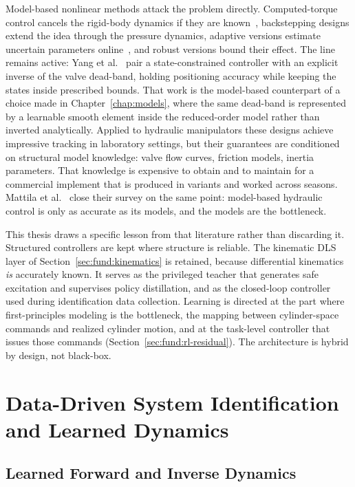 Model-based nonlinear methods attack the problem directly.
Computed-torque control cancels the rigid-body dynamics if they are
known~\cite{slotine1991applied}, backstepping designs extend the idea
through the pressure dynamics, adaptive versions estimate uncertain
parameters online~\cite{astrom1995adaptive}, and robust versions bound
their effect. The line remains active: Yang et
al.~\cite{yang2026stateconstrained} pair a state-constrained controller
with an explicit inverse of the valve dead-band, holding positioning
accuracy while keeping the states inside prescribed bounds. That work is
the model-based counterpart of a choice made in
Chapter~\ref{chap:models}, where the same dead-band is represented by a
learnable smooth element inside the reduced-order model rather than
inverted analytically. Applied to hydraulic manipulators these designs
achieve impressive tracking in laboratory settings, but their guarantees
are conditioned on structural model knowledge: valve flow curves,
friction models, inertia parameters. That knowledge is expensive to obtain and to maintain for a commercial
implement that is produced in variants and worked across seasons. Mattila et
al.~\cite{mattila2017survey} close their survey on the same point: model-based
hydraulic control is only as accurate as its models, and the models are the
bottleneck.

This thesis draws a specific lesson from that literature rather than
discarding it. Structured controllers are kept where structure is
reliable. The kinematic DLS layer of Section~\ref{sec:fund:kinematics}
is retained, because differential kinematics \emph{is} accurately known.
It serves as the privileged teacher that generates safe excitation and
supervises policy distillation, and as the closed-loop controller used
during identification data collection. Learning is directed at the part
where first-principles modeling is the bottleneck, the mapping between
cylinder-space commands and realized cylinder motion, and at the
task-level controller that issues those commands
(Section~\ref{sec:fund:rl-residual}). The architecture is hybrid by
design, not black-box.

\section{Data-Driven System Identification and Learned Dynamics}
\label{sec:fund:learned-dynamics}

\subsection{Learned Forward and Inverse Dynamics}

